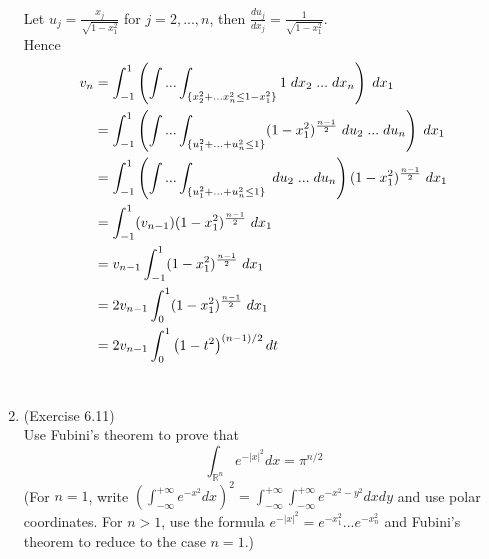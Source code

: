 \documentclass[a4paper,11pt]{article}
\begin{document}
\begin{enumerate}
 		Let $u_j = \frac{x_j}{\sqrt{1 - x_1^2}}$ for $j = 2,...,n$, then $\frac{d u_j}{dx_j} = \frac{1}{\sqrt{1 - x_1^2}}$.\\
 		Hence
 		$$\begin{aligned}
 		v_n
 		&= \int_{-1}^{1}  \left( \int ... \int_{\{ x_2^2 + ... x_n^2 \leq 1 - x_1^2 \}} 1 \hspace{0.1cm} dx_2 \hspace{0.1cm} ... \hspace{0.1cm} dx_n \right) \hspace{0.1cm} dx_1\\
 		&= \int_{-1}^{1} \left( \int ... \int_{\{ u_1^2 + ... + u_n^2 \leq 1 \}} (1 - x_1^2)^{\frac{n-1}{2}} \hspace{0.1cm} du_2 \hspace{0.1cm} ... \hspace{0.1cm} du_n \right) \hspace{0.1cm} dx_1\\
 		&= \int_{-1}^{1} \left( \int ... \int_{\{ u_1^2 + ... + u_n^2 \leq 1 \}}  \hspace{0.1cm} du_2 \hspace{0.1cm} ... \hspace{0.1cm} du_n \right) (1 - x_1^2)^{\frac{n-1}{2}} \hspace{0.1cm} dx_1\\
 		&= \int_{-1}^{1} (v_{n-1}) (1 - x_1^2)^{\frac{n-1}{2}} \hspace{0.1cm} dx_1\\
 		&= v_{n-1} \int_{-1}^{1} (1 - x_1^2)^{\frac{n-1}{2}} \hspace{0.1cm} dx_1\\
 		&= 2v_{n-1} \int_{0}^{1} (1 - x_1^2)^{\frac{n-1}{2}} \hspace{0.1cm} dx_1\\
 		&= 2v_{n-1} \int_0^1 \left( 1 - t^2 \right)^{(n-1)/2} dt
 		\end{aligned}$$\






	\item (Exercise 6.11)\\
		Use Fubini's theorem to prove that
		$$\int_{\mathbb{R}^n} e^{-|x|^2} dx = \pi^{n/2}$$
		(For $n = 1$, write $\left( \int_{-\infty}^{+\infty} e^{-x^2} dx \right)^2 = \int_{-\infty}^{+\infty} \int_{-\infty}^{+\infty} e^{-x^2-y^2} dx dy$ and use polar coordinates. For $n > 1$, use the formula $e^{-|x|^2} = e^{-x_1^2} ... e^{-x_n^2}$ and Fubini's theorem to reduce to the case $n = 1$.)\\


\end{enumerate}
\end{document}
